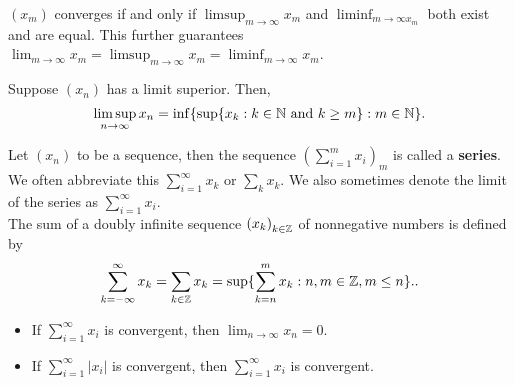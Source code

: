 \begin{remark}
	\(\left( x_{m} \right) \) converges if and only if \(\limsup_{m \to \infty}x_{m}\) and \(\liminf_{m \to \infty x_{m}}\) both exist and are equal. This further guarantees \(\lim_{m \to \infty}x_{m} = \limsup_{m \to \infty}x_{m} = \liminf_{m \to \infty}x_{m}\).
\end{remark}
\begin{proposition}
	Suppose \(\left( x_{n} \right) \) has a limit superior. Then, \[
	\limsup_{n \to \infty}x_{n} = \inf \{\sup \{x_{k} : k \in \mathbb{N} \text{ and } k \ge m\} : m \in \mathbb{N} \}
	.\]
\end{proposition}
\begin{definition}[Series]
	Let \(\left( x_{n} \right) \) to be a sequence, then the sequence \(\left( \sum_{i= 1}^{m} x_{i} \right)_{m} \) is called a \textbf{series}. We often abbreviate this \(\sum_{i= 1}^{\infty} x_{k}\) or \(\sum_{k}^{} x_{k}\). We also sometimes denote the limit of the series as \(\sum_{i= 1}^{\infty} x_{i}\).\\
	The sum of a doubly infinite sequence \(\left( x_{k} \right)_{k \in \mathbb{Z}} \) of nonnegative numbers is defined by \[
		\sum_{k=-\infty}^{\infty} x_{k} = \sum_{ k\in \mathbb{Z}}^{} x_{k} = \sup \{\sum_{k = n}^{m} x_{k} : n, m \in \mathbb{Z}, m \le n\} .
	.\]
\end{definition}
\begin{proposition}
	\begin{itemize}
	\item If \(\sum_{i= 1}^{\infty} x_{i}\) is convergent, then \(\lim_{n \to \infty}x_{n} = 0\).
		\item If \(\sum_{i=1}^{\infty}\left| x_{i} \right| \)  is convergent, then \(\sum_{i= 1}^{\infty} x_{i}\) is convergent.
		\end{itemize}
\end{proposition}
